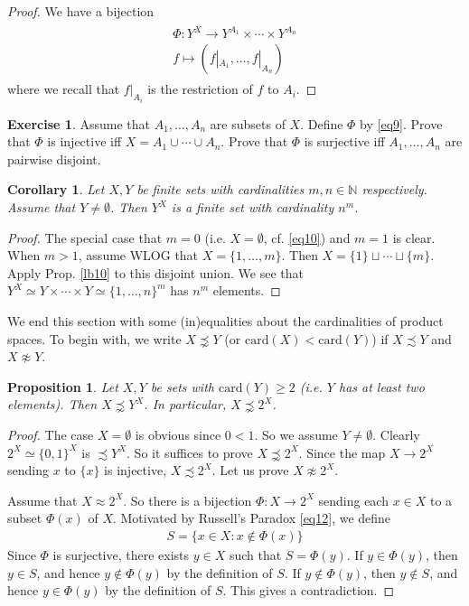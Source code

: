 \documentclass[12pt,b5paper,notitlepage]{article}
\theoremstyle{definition}
\newtheorem{exe}[df]{Exercise}
\theoremstyle{plain}
\newtheorem{pp}[df]{Proposition}
\newtheorem{co}[df]{Corollary}
\newcommand{\Nbb}{\mathbb N}
\newcommand{\card}{\mathrm{card}}
\numberwithin{equation}{section}
\begin{document}
\begin{proof}
We have a bijection
\begin{gather}\label{eq9}
\begin{gathered}
\Phi:Y^X\rightarrow Y^{A_1}\times \cdots\times Y^{A_n}\\
f\mapsto (f|_{A_1},\dots,f|_{A_n})
\end{gathered}
\end{gather}
where we recall that $f|_{A_i}$ is the restriction of $f$ to $A_i$. 
\end{proof}

\begin{exe}
Assume that $A_1,\dots,A_n$ are subsets of $X$. Define $\Phi$ by \eqref{eq9}. Prove that $\Phi$ is injective iff $X=A_1\cup\cdots\cup A_n$. Prove that $\Phi$ is surjective iff $A_1,\dots, A_n$ are pairwise disjoint. 
\end{exe}

\begin{co}\label{lb12}
Let $X,Y$ be finite sets with cardinalities $m,n\in\Nbb$ respectively. Assume that $Y\neq\emptyset$. Then $Y^X$ is a finite set with cardinality $n^m$.
\end{co}

\begin{proof}
The special case that $m=0$ (i.e. $X=\emptyset$, cf. \eqref{eq10}) and $m=1$ is clear. When $m>1$, assume WLOG that $X=\{1,\dots,m\}$. Then $X=\{1\}\sqcup\cdots\sqcup\{m\}$. Apply Prop. \ref{lb10} to this disjoint union. We see that $Y^X\simeq Y\times \cdots\times Y\simeq\{1,\dots,n\}^m$ has $n^m$ elements.
\end{proof}



We end this section with some (in)equalities about the cardinalities of product spaces. To begin with, we write $X\precnsim Y$ (or $\card(X)<\card(Y)$) if $X\precsim Y$ and $X\napprox Y$.

\begin{pp}\label{lb14}
Let $X,Y$ be sets with $\card(Y)\geq 2$ (i.e. $Y$ has at least two elements). Then $X\precnsim Y^X$. In particular, $X\precnsim 2^X$.
\end{pp}

\begin{proof}
The case $X=\emptyset$ is obvious since $0<1$. So we assume $Y\neq\emptyset$. Clearly $2^X\simeq\{0,1\}^X$ is $\precsim Y^X$. So it suffices to prove $X\precnsim 2^X$. Since the map $X\rightarrow 2^X$ sending $x$ to $\{x\}$ is injective, $X\precsim 2^X$. Let us prove $X\napprox 2^X$.

Assume that $X\approx 2^X$. So there is a bijection $\Phi:X\rightarrow 2^X$ sending each $x\in X$ to a subset $\Phi(x)$ of $X$. Motivated by Russell's Paradox \eqref{eq12}, we define
\begin{align*}
S=\{x\in X:x\notin \Phi(x)\}
\end{align*}
Since $\Phi$ is surjective, there exists $y\in X$ such that $S=\Phi(y)$. If $y\in\Phi(y)$, then $y\in S$, and hence $y\notin \Phi(y)$ by the definition of $S$. If $y\notin\Phi(y)$, then $y\notin S$, and hence $y\in\Phi(y)$ by the definition of $S$. This gives a contradiction.
\end{proof}
\end{document}
